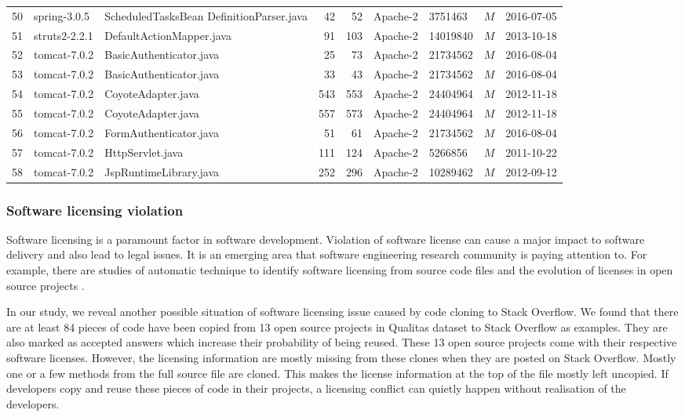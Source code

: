 \documentclass{sig-alternate-05-2015}
\begin{document}
\begin{table}
\begin{tabular}{r|l|p{4.5cm}|r|r|l|l|c|l}
			50 & spring-3.0.5  & ScheduledTasksBean \newline DefinitionParser.java  & 42 & 52 & Apache-2 & 3751463 & $M$  & 2016-07-05 \\
			51 & struts2-2.2.1  & DefaultActionMapper.java  & 91 & 103 & Apache-2 & 14019840 & $M$  & 2013-10-18 \\
			52 & tomcat-7.0.2  & BasicAuthenticator.java  & 25 & 73 & Apache-2 & 21734562 & $M$  & 2016-08-04 \\
			53 & tomcat-7.0.2  & BasicAuthenticator.java  & 33 & 43 & Apache-2 & 21734562 & $M$  & 2016-08-04 \\
			54 & tomcat-7.0.2  & CoyoteAdapter.java  & 543 & 553 & Apache-2 & 24404964 & $M$  & 2012-11-18 \\
			55 & tomcat-7.0.2  & CoyoteAdapter.java  & 557 & 573 & Apache-2 & 24404964 & $M$  & 2012-11-18 \\
			56 & tomcat-7.0.2  & FormAuthenticator.java  & 51 & 61 & Apache-2 & 21734562 & $M$  & 2016-08-04 \\
			57 & tomcat-7.0.2  & HttpServlet.java  & 111 & 124 & Apache-2 & 5266856 & $M$  & 2011-10-22 \\
			58 & tomcat-7.0.2  & JspRuntimeLibrary.java  & 252 & 296 & Apache-2 & 10289462 & $M$  & 2012-09-12 \\
		\hline
	\end{tabular} %
\end{table}

\subsubsection{Software licensing violation}
Software licensing is a paramount factor in software development. Violation of software license can cause a major impact to software delivery and also lead to legal issues. It is an emerging area that software engineering research community is paying attention to. For example, there are studies of automatic technique to identify software licensing from source code files \cite{German2010} and the evolution of licenses in open source projects \cite{DiPenta2010}.

In our study, we reveal another possible situation of software licensing issue caused by code cloning to Stack Overflow. We found that there are at least 84 pieces of code have been copied from 13 open source projects in Qualitas dataset to Stack Overflow as examples. They are also marked as accepted answers which increase their probability of being reused. These 13 open source projects come with their respective software licenses. However, the licensing information are mostly missing from these clones when they are posted on Stack Overflow. Mostly one or a few methods from the full source file are cloned. This makes the license information at the top of the file mostly left uncopied. If developers copy and reuse these pieces of code in their projects, a licensing conflict can quietly happen without realisation of the developers. 
\end{document}
